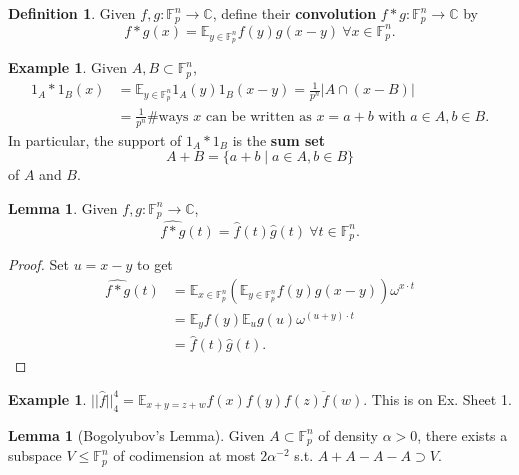 \documentclass{article}
\theoremstyle{definition}
\newtheorem{lemma}[theorem]{Lemma}
\newtheorem{example}[theorem]{Example}
\newtheorem{defn}[theorem]{Definition}
\begin{document}

\begin{defn}\label{defn1.9}
    Given $f, g : \mathbb{F}_p^n \to \mathbb{C}$, define their \textbf{convolution} $f * g :\mathbb{F}_p^n \to \mathbb{C}$ by $$f*g(x) = \mathbb{E}_{y \in \mathbb{F}_p^n}f(y)g(x-y) ~\forall x \in \mathbb{F}_p^n.$$
\end{defn}
\begin{example}\label{ex1.10}
    Given $A, B \subset \mathbb{F}_p^n$, 
    \begin{align*}
        1_A * 1_B(x) &= \mathbb{E}_{y \in \mathbb{F}_p^n}1_A(y)1_B(x-y) = \frac{1}{p^n}|A \cap (x-B)| \\
        &= \frac{1}{p^n} \# \text{ways }x \text{ can be written as }x=a+b \text{ with }a \in A, b \in B.
    \end{align*}
    In particular, the support of $1_A * 1_B$ is the \textbf{sum set} \[
    A+B = \{a+b \mid a \in A, b \in B\}
    \]
    of $A$ and $B$.
\end{example}
\begin{lemma}\label{lemma1.11}
    Given $f, g : \mathbb{F}_p^n \to \mathbb{C}$, $$\widehat{f * g}(t) = \hat{f}(t)\hat{g}(t) ~\forall t \in \mathbb{F}_p^n.$$
\end{lemma}
\begin{proof}
    Set $u = x-y$ to get
    \begin{align*}
        \widehat{f * g}(t) &= \mathbb{E}_{x \in \mathbb{F}_p^n}\left(\mathbb{E}_{y \in \mathbb{F}_p^n}f(y)g(x-y)\right)\omega^{x \cdot t} \\
        &= \mathbb{E}_y f(y) \mathbb{E}_u g(u) \omega^{(u+y)\cdot t} \\
        &= \hat{f}(t)\hat{g}(t).
    \end{align*}
\end{proof}
\begin{example}
    $||\hat{f}||_4^4 = \mathbb{E}_{x+y=z+w}f(x)f(y)\overline{f(z)f(w)}$. This is on Ex. Sheet 1.
\end{example}
\begin{lemma}[Bogolyubov's Lemma]
    Given $A \subset \mathbb{F}_p^n$ of density $\alpha>0$, there exists a subspace $V\le \mathbb{F}_p^n$ of codimension at most $2\alpha^{-2}$ s.t. $A+A-A-A \supset V$. 
\end{lemma}
\end{document}

